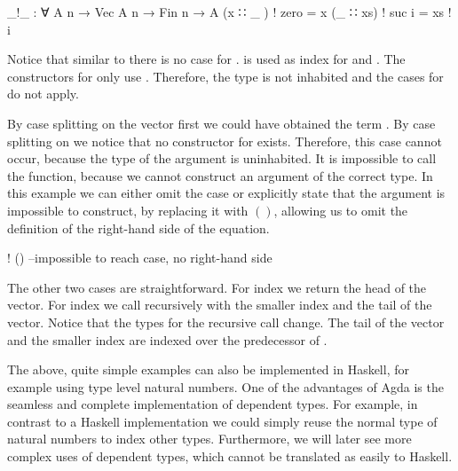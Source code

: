 \begin{AgdaAlign}
\begin{code}
_!_ : ∀ {A n} → Vec A n → Fin n → A
(x  ∷ _ )  ! zero   = x
(_  ∷ xs)  ! suc i  = xs ! i
\end{code}
Notice that similar to  there is no case for
\AgdaInductiveConstructor{[]}.
 is used as index for
\AgdaSpace{} and .
The constructors for  only use .
Therefore, the type
\AgdaSpace{}
is not inhabited and the cases for \AgdaInductiveConstructor{[]} do not apply.

By case splitting on the vector first we could have obtained the term
\AgdaInductiveConstructor{[]}\AgdaSpace{}\AgdaFunction{!}\AgdaSpace{}.
By case splitting on  we notice that no constructor for
 exists.
Therefore, this case cannot occur, because the type of the argument is
uninhabited.
It is impossible to call the function, because we cannot construct an argument of
the correct type.
In this example we can either omit the case or explicitly state that the
argument is impossible to construct, by replacing it with $()$, allowing us to
omit the definition of the right-hand side of the equation.

\begin{code}
[]         ! () --impossible to reach case, no right-hand side
\end{code}
\end{AgdaAlign}
The other two cases are straightforward.
For index  we return the head of the vector.
For index \AgdaSpace{} we call
\AgdaFunction{\_!\_} recursively with the smaller index and the tail of the
vector.
Notice that the types for the recursive call change.
The tail of the vector  and the smaller index 
are indexed over the predecessor of .

The above, quite simple examples can also be implemented in Haskell, for
example using type level natural numbers.
One of the advantages of Agda is the seamless and complete implementation of
dependent types.
For example, in contrast to a Haskell implementation we could simply reuse the
normal type of natural numbers to index other types.
Furthermore, we will later see more complex uses of dependent types, which
cannot be translated as easily to Haskell.


